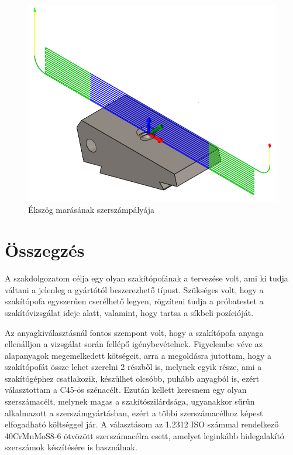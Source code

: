 \documentclass[12pt,a4paper,oneside]{report}
\begin{document}
\begin{figure}[H]
    \centering
    \includegraphics[width=12cm]{figures/alaptest_facemill_3.png}
    \caption{Ékszög marásának szerszámpályája}
    \label{Fig:alaptest_facemill_3}
\end{figure}





\chapter{Összegzés}
A szakdolgozatom célja egy olyan szakítópofának a tervezése volt, ami ki tudja váltani a jelenleg a gyártótól beszerezhető típust. Szükséges volt, hogy a szakítópofa egyszerűen cserélhető legyen, rögzíteni tudja a próbatestet a szakítóvizsgálat ideje alatt, valamint, hogy tartsa a síkbeli pozícióját.

Az anyagkiválasztásnál fontos szempont volt, hogy a szakítópofa anyaga ellenálljon a vizsgálat során fellépő igénybevételnek. Figyelembe véve az alapanyagok megemelkedett kötségeit, arra a megoldásra jutottam, hogy a szakítópofát össze lehet szerelni 2 részből is, melynek egyik része, ami a szakítógéphez csatlakozik, készülhet olcsóbb, puhább anyagból is, ezért választottam a C45-ös szénacélt. Ezután kellett keresnem egy olyan szerszámacélt, melynek magas a szakítószilárdsága, ugyanakkor sűrűn alkalmazott a szerszámgyártásban, ezért a többi szerszámacélhoz képest elfogadható költséggel jár. A választásom az 1.2312 ISO számmal rendelkező 40CrMnMoS8-6 ötvözött szerszámacélra esett, amelyet leginkább hidegalakító szerszámok készítésére is használnak.
\end{document}

